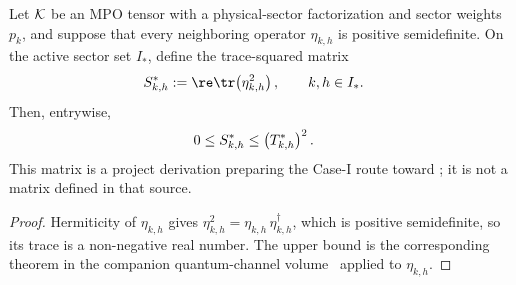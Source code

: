 \begin{lemma}
    \label{lem:mpdo_active_sector_trace_sq_matrix}
    \leanok
    Let ${\cal K}$ be an MPO tensor with a physical-sector factorization
    and sector weights $p_k$, and suppose that every neighboring
    operator $\eta_{k,h}$ is positive semidefinite. On the active
    sector set $I_*$, define the trace-squared matrix
    \begin{align}
        S^*_{k,h}
         & :=\re\tr\!\left(\eta_{k,h}^2\right),
        \qquad k,h\in I_*.
        \notag
    \end{align}
    Then, entrywise,
    \begin{align}
        0 & \leq S^*_{k,h}\leq\left(T^*_{k,h}\right)^2.
        \notag
    \end{align}
    This matrix is a project derivation preparing the Case-I route
    toward
    \cite[Appendix~C.2, Lemma~C.5, lines~1473--1499]{Cirac2016MPDO_arXiv};
    it is not a matrix defined in that source.
\end{lemma}

\begin{proof}
    \leanok
    Hermiticity of $\eta_{k,h}$ gives
    $\eta_{k,h}^2=\eta_{k,h}\,\eta_{k,h}^\dagger$, which is positive
    semidefinite, so its trace is a non-negative real number. The upper
    bound is the corresponding theorem in the companion quantum-channel volume~\cite[``Forward Lorentz-cone trace inequality'']{QICLean2026Blueprint} applied
    to $\eta_{k,h}$.
\end{proof}

